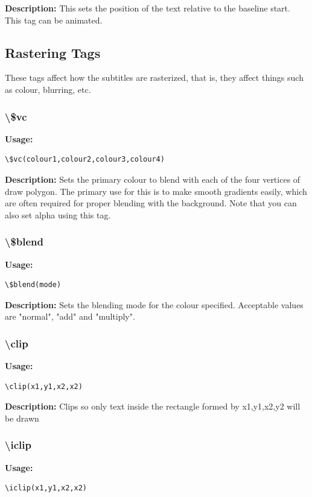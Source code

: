 \documentclass{spec}
\begin{document}
\textbf{Description:}
This sets the position of the text relative to the baseline start. This tag can be animated.

\subsection{Rastering Tags}
These tags affect how the subtitles are rasterized, that is, they affect things such as
colour, blurring, etc.

\subsubsection{\textbackslash \$vc}
\textbf{Usage:}
\begin{verbatim}
\$vc(colour1,colour2,colour3,colour4)
\end{verbatim}

\textbf{Description:}
Sets the primary colour to blend with each of the four vertices of draw polygon. The primary use for this is to make smooth gradients easily, which are often required for proper blending with the background. Note that you can also set alpha using this tag.

\subsubsection{\textbackslash \$blend}
\textbf{Usage:}
\begin{verbatim}
\$blend(mode)
\end{verbatim}

\textbf{Description:}
Sets the blending mode for the colour specified. Acceptable values are "normal", "add" and "multiply".

\subsubsection{\textbackslash clip}
\textbf{Usage:}
\begin{verbatim}
\clip(x1,y1,x2,x2)
\end{verbatim}

\textbf{Description:}
Clips so only text inside the rectangle formed by x1,y1,x2,y2 will be drawn

\subsubsection{\textbackslash iclip}
\textbf{Usage:}
\begin{verbatim}
\iclip(x1,y1,x2,x2)
\end{verbatim}
\end{document}
